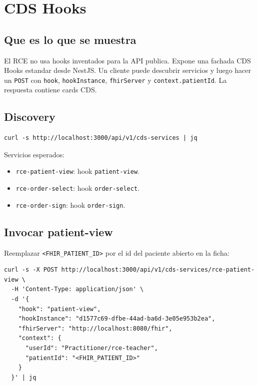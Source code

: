 \section{CDS Hooks}

\subsection{Que es lo que se muestra}

El RCE no usa hooks inventados para la API publica. Expone una fachada CDS
Hooks estandar desde NestJS. Un cliente puede descubrir servicios y luego hacer
un \texttt{POST} con \texttt{hook}, \texttt{hookInstance}, \texttt{fhirServer}
y \texttt{context.patientId}. La respuesta contiene cards CDS.

\subsection{Discovery}

\begin{lstlisting}
curl -s http://localhost:3000/api/v1/cds-services | jq
\end{lstlisting}

Servicios esperados:

\begin{itemize}
  \item \texttt{rce-patient-view}: hook \texttt{patient-view}.
  \item \texttt{rce-order-select}: hook \texttt{order-select}.
  \item \texttt{rce-order-sign}: hook \texttt{order-sign}.
\end{itemize}


\subsection{Invocar patient-view}

Reemplazar \texttt{<FHIR\_PATIENT\_ID>} por el id del paciente abierto en la
ficha:

\begin{lstlisting}
curl -s -X POST http://localhost:3000/api/v1/cds-services/rce-patient-view \
  -H 'Content-Type: application/json' \
  -d '{
    "hook": "patient-view",
    "hookInstance": "d1577c69-dfbe-44ad-ba6d-3e05e953b2ea",
    "fhirServer": "http://localhost:8080/fhir",
    "context": {
      "userId": "Practitioner/rce-teacher",
      "patientId": "<FHIR_PATIENT_ID>"
    }
  }' | jq
\end{lstlisting}

